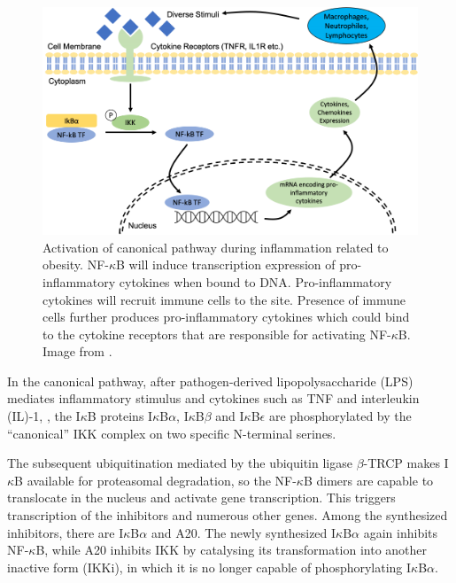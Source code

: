 \documentclass[12pt,a4paper]{report}
\begin{document}
\begin{figure}[!ht]
\includegraphics[scale=0.45]{NFkBmechanism.png}
\caption{Activation of canonical pathway during inflammation related to obesity. NF-$\kappa$B will induce transcription expression of pro-inflammatory cytokines when bound to DNA. Pro-inflammatory cytokines will recruit immune cells to the site. Presence of immune cells further produces pro-inflammatory cytokines which could bind to the cytokine receptors that are responsible for activating NF-$\kappa$B. Image from \cite{Project}.}
\label{NFkBmechanism}
\end{figure}
\newpage
In the canonical pathway, after pathogen-derived lipopolysaccharide (LPS) mediates inflammatory stimulus and cytokines such as TNF and interleukin (IL)-1, , the I$\kappa$B proteins I$\kappa$B$\alpha$, I$\kappa$B$\beta$ and I$\kappa$B$\epsilon$ are phosphorylated by the “canonical” IKK complex on two specific N-terminal serines.

The subsequent ubiquitination mediated by the ubiquitin ligase $\beta$-TRCP makes I$\kappa$B available for
proteasomal degradation, so the NF-$\kappa$B dimers are capable to translocate in the nucleus and
activate gene transcription. This triggers transcription of the inhibitors and numerous other genes. Among the synthesized inhibitors, there are I$\kappa$B$\alpha$ and A20. The newly synthesized I$\kappa$B$\alpha$ again inhibits NF-$\kappa$B, while A20 inhibits IKK by catalysing its transformation into another inactive form (IKKi), in which it is no longer capable of phosphorylating I$\kappa$B$\alpha$.
\end{document}
